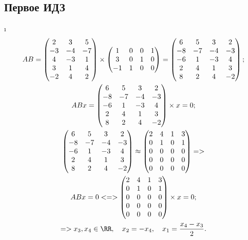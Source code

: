 \subsection{Первое ИДЗ}

\i
\begin{gather*}
    AB = \begin{pmatrix}
        2 & 3 & 5\\
        -3 & -4 & -7\\
        4 & -3 & 1\\
        3 & 1 & 4\\
        -2 & 4 & 2
    \end{pmatrix} \times \begin{pmatrix}
        1 & 0 & 0 & 1\\
        3 & 0 & 1 & 0\\
        -1 & 1 & 0 & 0
    \end{pmatrix} = \begin{pmatrix}
        6 & 5 & 3 & 2\\
        -8 & -7 & -4 & -3\\
        -6 & 1 & -3 & 4\\
        2 & 4 & 1 & 3\\
        8 & 2 & 4 & -2
    \end{pmatrix};\\
    ABx = \begin{pmatrix}
        6 & 5 & 3 & 2\\
        -8 & -7 & -4 & -3\\
        -6 & 1 & -3 & 4\\
        2 & 4 & 1 & 3\\
        8 & 2 & 4 & -2
    \end{pmatrix} \times x = 0;\\
    \begin{pmatrix}
        6 & 5 & 3 & 2\\
        -8 & -7 & -4 & -3\\
        -6 & 1 & -3 & 4\\
        2 & 4 & 1 & 3\\
        8 & 2 & 4 & -2
    \end{pmatrix} \approx \begin{pmatrix}
        2 & 4 & 1 & 3\\
        0 & 1 & 0 & 1\\
        0 & 0 & 0 & 0\\
        0 & 0 & 0 & 0\\
        0 & 0 & 0 & 0
    \end{pmatrix} => \\
    ABx = 0 <=> \begin{pmatrix}
        2 & 4 & 1 & 3\\
        0 & 1 & 0 & 1\\
        0 & 0 & 0 & 0\\
        0 & 0 & 0 & 0\\
        0 & 0 & 0 & 0
    \end{pmatrix} \times x = 0;\\
    => x_3, x_4 \in \RR, \quad x_2 = -x_4, \quad x_1 = \frac{x_4 - x_3}{2}.
\end{gather*}


